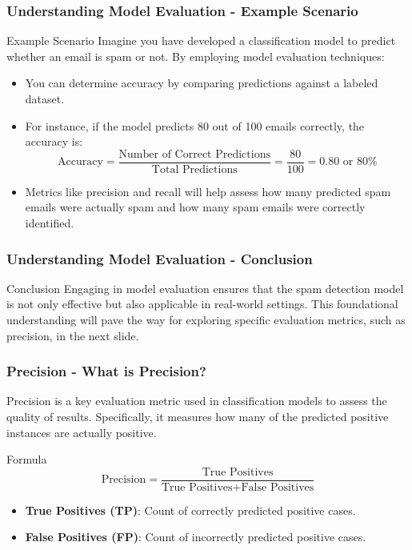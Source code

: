 \documentclass{beamer}
\begin{document}
\begin{frame}[fragile]
    \frametitle{Understanding Model Evaluation - Example Scenario}
    \begin{block}{Example Scenario}
        Imagine you have developed a classification model to predict whether an email is spam or not. By employing model evaluation techniques:
        \begin{itemize}
            \item You can determine accuracy by comparing predictions against a labeled dataset.
            \item For instance, if the model predicts 80 out of 100 emails correctly, the accuracy is:
            \begin{equation}
                \text{Accuracy} = \frac{\text{Number of Correct Predictions}}{\text{Total Predictions}} = \frac{80}{100} = 0.80 \text{ or } 80\%
            \end{equation}
            \item Metrics like precision and recall will help assess how many predicted spam emails were actually spam and how many spam emails were correctly identified.
        \end{itemize}
    \end{block}
\end{frame}

\begin{frame}[fragile]
    \frametitle{Understanding Model Evaluation - Conclusion}
    \begin{block}{Conclusion}
        Engaging in model evaluation ensures that the spam detection model is not only effective but also applicable in real-world settings. This foundational understanding will pave the way for exploring specific evaluation metrics, such as precision, in the next slide.
    \end{block}
\end{frame}

\begin{frame}[fragile]
    \frametitle{Precision - What is Precision?}
    Precision is a key evaluation metric used in classification models to assess the quality of results. 
    Specifically, it measures how many of the predicted positive instances are actually positive.

    \begin{block}{Formula}
        \[
        \text{Precision} = \frac{\text{True Positives}}{\text{True Positives} + \text{False Positives}}
        \]
    \end{block}

    \begin{itemize}
        \item \textbf{True Positives (TP)}: Count of correctly predicted positive cases.
        \item \textbf{False Positives (FP)}: Count of incorrectly predicted positive cases.
    \end{itemize}
\end{frame}
\end{document}
